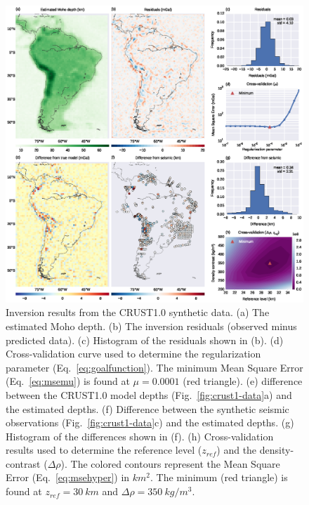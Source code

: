 \documentclass[extra]{gji}
\begin{document}
\begin{figure}
    \centering
    \includegraphics[width=\textwidth]{figures/synthetic-crust1-results}
    \caption{
        Inversion results from the CRUST1.0 synthetic data.
        (a) The estimated Moho depth.
        (b) The inversion residuals (observed minus predicted data).
        (c) Histogram of the residuals shown in (b).
        (d) Cross-validation curve used to determine
        the regularization parameter (Eq.~\ref{eq:goalfunction}).
        The minimum Mean Square Error (Eq.~\ref{eq:msemu}) is found at
        $\mu = 0.0001$ (red triangle).
        (e) difference between the CRUST1.0 model depths
        (Fig.~\ref{fig:crust1-data}a)
        and the estimated depths.
        (f) Difference between the synthetic seismic observations
        (Fig.~\ref{fig:crust1-data}c)
        and the estimated depths.
        (g) Histogram of the differences shown in (f).
        (h) Cross-validation results used to determine
        the reference level ($z_{ref}$) and the density-contrast ($\Delta\rho$).
        The colored contours represent
        the Mean Square Error (Eq.~\ref{eq:msehyper}) in $km^2$.
        The minimum (red triangle) is found at $z_{ref} = 30\ km$
        and $\Delta\rho = 350\ kg/m^3$.
    }
    \label{fig:crust1-results}
\end{figure}
\end{document}
